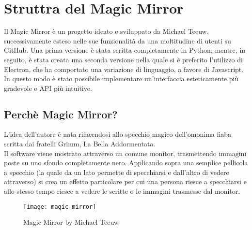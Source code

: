 \chapter{Struttra del Magic Mirror}

Il Magic Mirror \`e un progetto ideato e sviluppato da Michael Teeuw, successivamente esteso nelle sue funzionalit\`a da una moltitudine di utenti su GitHub.
Una prima versione \`e stata scritta completamente in Python, mentre, in seguito, \`e stata creata una seconda versione nella quale si \`e preferito l'utilizzo di Electron,
che ha comportato una variazione di linguaggio, a favore di Javascript. In questo modo \`e stato possibile implementare un'interfaccia esteticamente pi\`u gradevole
e API pi\`u intuitive.
\\[2\baselineskip]

\section{Perch\`e Magic Mirror?}
L'idea dell'autore \`e nata rifacendosi allo specchio magico dell'omonima fiaba
scritta dai fratelli Grimm, La Bella Addormentata.\\
Il software viene mostrato attraverso un
comune monitor, trasmettendo immagini poste su uno sfondo completamente nero. Applicando sopra
una semplice pellicola a specchio (la quale da un lato permette di specchiarsi e dall'altro di vedere
attraverso) si crea un effetto particolare per cui una persona riesce a specchiarsi
e allo stesso tempo riesce a vedere le scritte o le immagini trasmesse dal monitor.
\\[2\baselineskip]
\begin{figure}[H]
    \texttt{[image: magic\_mirror]}
    \caption{Magic Mirror by Michael Teeuw}
\end{figure}

